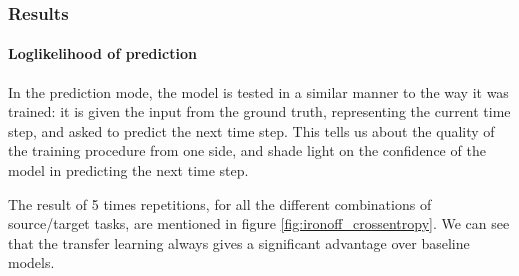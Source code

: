     \subsubsection{Results}
    \paragraph{Loglikelihood of prediction}
      In the prediction mode, the model is tested in a similar manner to the way it was trained: it is given the input from the ground truth, representing the current time step, and asked to predict the next time step. This tells us about the quality of the training procedure from one side, and shade light on the confidence of the model in predicting the next time step.

      The result of 5 times repetitions, for all the different combinations of source/target tasks, are mentioned in figure \ref{fig:ironoff_crossentropy}. We can see that the transfer learning always gives a significant advantage over baseline models.
